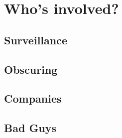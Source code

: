 \section{Who's involved?}

\subsection{Surveillance} 

\subsection{Obscuring}

\subsection{Companies} %

\subsection{Bad Guys}

